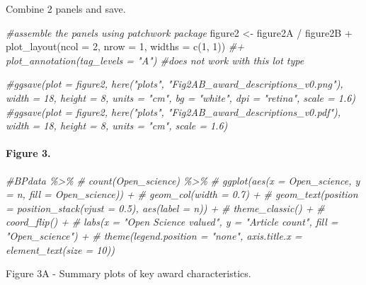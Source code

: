 \documentclass[
]{article}
\newenvironment{Shaded}{\begin{snugshade}}{\end{snugshade}}
\newcommand{\AttributeTok}[1]{\textcolor[rgb]{0.77,0.63,0.00}{#1}}
\newcommand{\CommentTok}[1]{\textcolor[rgb]{0.56,0.35,0.01}{\textit{#1}}}
\newcommand{\DecValTok}[1]{\textcolor[rgb]{0.00,0.00,0.81}{#1}}
\newcommand{\FunctionTok}[1]{\textcolor[rgb]{0.00,0.00,0.00}{#1}}
\newcommand{\NormalTok}[1]{#1}
\newcommand{\OtherTok}[1]{\textcolor[rgb]{0.56,0.35,0.01}{#1}}
\newcommand{\SpecialCharTok}[1]{\textcolor[rgb]{0.00,0.00,0.00}{#1}}
\begin{document}
Combine 2 panels and save.

\begin{Shaded}
\begin{Highlighting}[]
\CommentTok{\#assemble the panels using patchwork package}
\NormalTok{figure2 }\OtherTok{\textless{}{-}}\NormalTok{ figure2A }\SpecialCharTok{/}\NormalTok{ figure2B }\SpecialCharTok{+} 
  \FunctionTok{plot\_layout}\NormalTok{(}\AttributeTok{ncol =} \DecValTok{2}\NormalTok{, }\AttributeTok{nrow =} \DecValTok{1}\NormalTok{, }\AttributeTok{widths =} \FunctionTok{c}\NormalTok{(}\DecValTok{1}\NormalTok{, }\DecValTok{1}\NormalTok{)) }\CommentTok{\#+  plot\_annotation(tag\_levels = "A") \#does not work with this lot type}

\CommentTok{\#ggsave(plot = figure2, here("plots", "Fig2AB\_award\_descriptions\_v0.png"), width = 18, height = 8, units = "cm", bg = "white", dpi = "retina", scale = 1.6)}
\CommentTok{\#ggsave(plot = figure2, here("plots", "Fig2AB\_award\_descriptions\_v0.pdf"), width = 18, height = 8, units = "cm", scale = 1.6)}
\end{Highlighting}
\end{Shaded}

\hypertarget{figure-3.}{%
\paragraph{Figure 3.}\label{figure-3.}}

\begin{Shaded}
\begin{Highlighting}[]
\CommentTok{\#BPdata \%\textgreater{}\%}
\CommentTok{\#    count(Open\_science) \%\textgreater{}\%}
\CommentTok{\#    ggplot(aes(x = Open\_science, y = n, fill = Open\_science)) + }
\CommentTok{\#    geom\_col(width = 0.7) +}
\CommentTok{\#    geom\_text(position = position\_stack(vjust = 0.5), aes(label = n)) + }
\CommentTok{\#    theme\_classic() + }
\CommentTok{\#    coord\_flip() +}
\CommentTok{\#    labs(x = "Open Science valued", y = "Article count", fill = "Open\_science") + }
\CommentTok{\#    theme(legend.position = "none", axis.title.x = element\_text(size = 10))}
\end{Highlighting}
\end{Shaded}

Figure 3A - Summary plots of key award characteristics.
\end{document}
